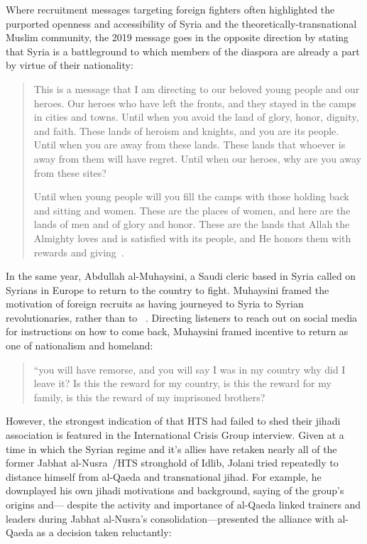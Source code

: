Where recruitment messages targeting foreign fighters often highlighted the purported openness and accessibility of Syria and the theoretically-transnational Muslim community, the 2019 message goes in the opposite direction by stating that Syria is a battleground to which members of the diaspora are already a part by virtue of their nationality:

\begin{quote} 
This is a message that I am directing to our beloved young people and our heroes. Our heroes who have left the fronts, and they stayed in the camps in cities and towns. Until when you avoid the land of glory, honor, dignity, and faith. These lands of heroism and knights, and you are its people. Until when you are away from these lands. These lands that whoever is away from them will have regret. Until when our heroes, why are you away from these sites?

Until when young people will you fill the camps with those holding back and sitting and women. These are the places of women, and here are the lands of men and of glory and honor. These are the lands that Allah the Almighty loves and is satisfied with its people, and He honors them with rewards and giving~\autocite{hts2019join}.\end{quote}

In the same year, Abdullah al-Muhaysini, a Saudi cleric based in Syria called on Syrians in Europe to return to the country to fight. Muhaysini framed the motivation of foreign recruits as having journeyed to Syria to  Syrian revolutionaries,  rather than to ~\autocite{muhaysini2019capital}. Directing listeners to reach out on social media for instructions on how to come back, Muhaysini framed incentive to return as one of nationalism and homeland:

\begin{quote}
“you will have remorse, and you will say I was in my country why did I leave it? Is this the reward for my country, is this the reward for my family, is this the reward of my imprisoned brothers?~\autocite{muhaysini2019capital}\end{quote}

However, the strongest indication of that HTS had failed to shed their jihadi association is featured in the International Crisis Group interview. Given at a time in which the Syrian regime and it's allies have retaken nearly all of the former Jabhat al-Nusra~/HTS stronghold of Idlib, Jolani tried repeatedly to distance himself from al-Qaeda and transnational jihad. For example, he downplayed his own jihadi motivations and background, saying of the group's origins and--- despite the activity and importance of al-Qaeda linked trainers and leaders during Jabhat al-Nusra's consolidation---presented the alliance with al-Qaeda as a decision taken reluctantly:

